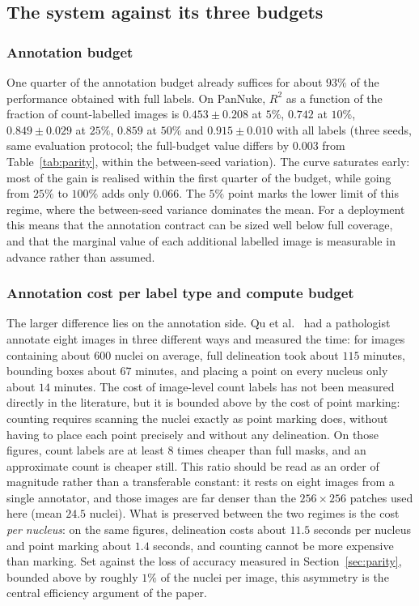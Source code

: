 \documentclass[preprint,12pt]{elsarticle}
\begin{document}
\subsection{The system against its three budgets}\label{sec:deploy}
\subsubsection{Annotation budget}\label{sec:label}
One quarter of the annotation budget already suffices for about $93\%$ of the performance obtained with full
labels. On PanNuke, $R^2$ as a function of the fraction of count-labelled images is $0.453 \pm 0.208$ at $5\%$,
$0.742$ at $10\%$, $0.849 \pm 0.029$ at $25\%$, $0.859$ at $50\%$ and $0.915 \pm 0.010$ with all labels (three
seeds, same evaluation protocol; the full-budget value differs by $0.003$ from Table~\ref{tab:parity}, within
the between-seed variation). The curve saturates early: most of the gain is realised within the first quarter
of the budget, while going from $25\%$ to $100\%$ adds only $0.066$. The $5\%$ point marks the lower limit of
this regime, where the between-seed variance dominates the mean. For a deployment this means that the
annotation contract can be sized well below full coverage, and that the marginal value of each additional
labelled image is measurable in advance rather than assumed.

\subsubsection{Annotation cost per label type and compute budget}\label{sec:cost}
The larger difference lies on the annotation side. Qu et al.~\cite{qu2020} had a pathologist annotate eight
images in three different ways and measured the time: for images containing about $600$ nuclei on average, full
delineation took about $115$ minutes, bounding boxes about $67$ minutes, and placing a point on every nucleus
only about $14$ minutes. The cost of image-level count labels has not been measured directly in the
literature, but it is bounded above by the cost of point marking: counting requires scanning the nuclei exactly
as point marking does, without having to place each point precisely and without any delineation. On those
figures, count labels are at least $8$ times cheaper than full masks, and an approximate count is cheaper
still. This ratio should be read as an order of magnitude rather than a transferable constant: it rests on
eight images from a single annotator, and those images are far denser than the $256\times256$ patches used
here (mean $24.5$ nuclei). What is preserved between the two regimes is the cost \emph{per nucleus}: on the
same figures, delineation costs about $11.5$ seconds per nucleus and point marking about $1.4$ seconds, and
counting cannot be more expensive than marking. Set against the loss of accuracy measured in
Section~\ref{sec:parity}, bounded above by roughly $1\%$ of the nuclei per image, this asymmetry is the central
efficiency argument of the paper.
\end{document}
